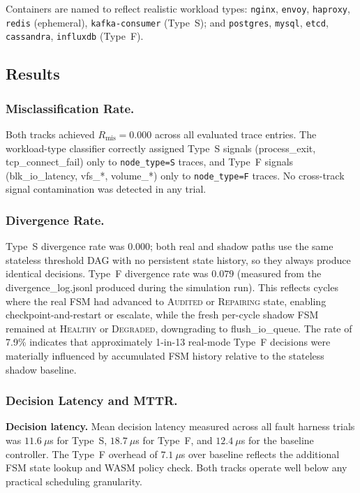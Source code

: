 \documentclass[runningheads]{llncs}
\begin{document}
Containers are named to reflect realistic workload types:
\texttt{nginx}, \texttt{envoy}, \texttt{haproxy}, \texttt{redis} (ephemeral),
\texttt{kafka-consumer} (Type~S); and \texttt{postgres}, \texttt{mysql},
\texttt{etcd}, \texttt{cassandra}, \texttt{influxdb} (Type~F).

\subsection{Results}

\subsubsection{Misclassification Rate.}

Both tracks achieved $R_\text{mis} = 0.000$ across all evaluated
trace entries.  The workload-type classifier correctly assigned Type~S
signals (process\_exit, tcp\_connect\_fail) only to
\texttt{node\_type=S} traces, and Type~F signals
(blk\_io\_latency, vfs\_*, volume\_*) only to \texttt{node\_type=F}
traces.  No cross-track signal contamination was detected in any trial.

\subsubsection{Divergence Rate.}

Type~S divergence rate was $0.000$; both real and shadow paths use
the same stateless threshold DAG with no persistent state history, so
they always produce identical decisions.  Type~F divergence rate was
$0.079$ (measured from the divergence\_log.jsonl produced during the
simulation run).  This reflects cycles where the real FSM had advanced
to \textsc{Audited} or \textsc{Repairing} state, enabling
checkpoint-and-restart or escalate, while the fresh per-cycle shadow
FSM remained at \textsc{Healthy} or \textsc{Degraded}, downgrading to
flush\_io\_queue.  The rate of 7.9\% indicates that approximately
1-in-13 real-mode Type~F decisions were materially influenced by
accumulated FSM history relative to the stateless shadow baseline.

\subsubsection{Decision Latency and MTTR.}

\noindent\textbf{Decision latency.}  Mean decision latency measured
across all fault harness trials was $11.6~\mu$s for Type~S,
$18.7~\mu$s for Type~F, and $12.4~\mu$s for the baseline controller.
The Type~F overhead of $7.1~\mu$s over baseline reflects the
additional FSM state lookup and WASM policy check.  Both tracks
operate well below any practical scheduling granularity.
\end{document}
